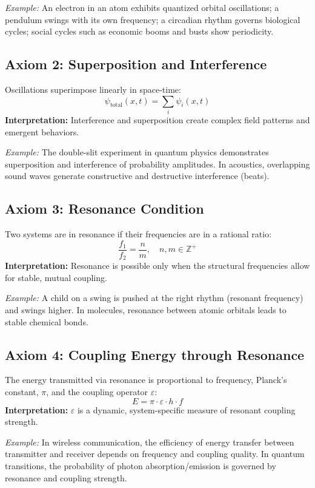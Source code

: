 \documentclass[12pt]{article}
\begin{document}
	\textit{Example:} An electron in an atom exhibits quantized orbital oscillations; a pendulum swings with its own frequency; a circadian rhythm governs biological cycles; social cycles such as economic booms and busts show periodicity.
	
	\subsection{Axiom 2: Superposition and Interference}
	Oscillations superimpose linearly in space-time:
	\[
	\psi_{\text{total}}(x, t) = \sum_i \psi_i(x, t)
	\]
	\textbf{Interpretation:} Interference and superposition create complex field patterns and emergent behaviors.
	
	\textit{Example:} The double-slit experiment in quantum physics demonstrates superposition and interference of probability amplitudes. In acoustics, overlapping sound waves generate constructive and destructive interference (beats).
	
	\subsection{Axiom 3: Resonance Condition}
	Two systems are in resonance if their frequencies are in a rational ratio:
	\[
	\frac{f_1}{f_2} = \frac{n}{m},\quad n, m \in \mathbb{Z}^+
	\]
	\textbf{Interpretation:} Resonance is possible only when the structural frequencies allow for stable, mutual coupling.
	
	\textit{Example:} A child on a swing is pushed at the right rhythm (resonant frequency) and swings higher. In molecules, resonance between atomic orbitals leads to stable chemical bonds.
	
	\subsection{Axiom 4: Coupling Energy through Resonance}
	The energy transmitted via resonance is proportional to frequency, Planck's constant, $\pi$, and the coupling operator $\varepsilon$:
	\[
	E = \pi \cdot \varepsilon \cdot h \cdot f
	\]
	\textbf{Interpretation:} $\varepsilon$ is a dynamic, system-specific measure of resonant coupling strength.
	
	\textit{Example:} In wireless communication, the efficiency of energy transfer between transmitter and receiver depends on frequency and coupling quality. In quantum transitions, the probability of photon absorption/emission is governed by resonance and coupling strength.
	
\end{document}
